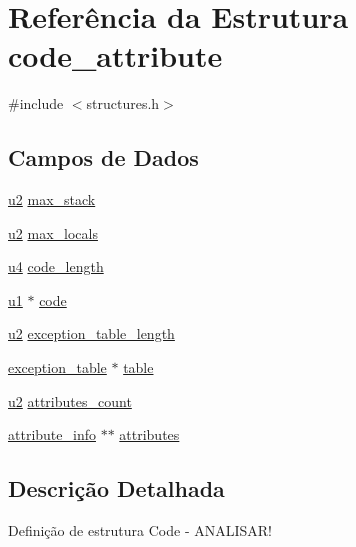 \hypertarget{structcode__attribute}{}\section{Referência da Estrutura code\+\_\+attribute}
\label{structcode__attribute}


{\ttfamily \#include $<$structures.\+h$>$}

\subsection*{Campos de Dados}
\begin{DoxyCompactItemize}
\item 
\hyperlink{lista__operandos_8h_a732cde1300aafb73b0ea6c2558a7a54f}{u2} \hyperlink{structcode__attribute_abd4d398c165a4e91f3ea559808931473}{max\+\_\+stack}
\item 
\hyperlink{lista__operandos_8h_a732cde1300aafb73b0ea6c2558a7a54f}{u2} \hyperlink{structcode__attribute_ab75487f3c1d38f9fb6ad5e71ab99dea2}{max\+\_\+locals}
\item 
\hyperlink{lista__operandos_8h_ae5be1f726785414dd1b77d60df074c9d}{u4} \hyperlink{structcode__attribute_a8c2176f2e2a92747fd2920fde5992b43}{code\+\_\+length}
\item 
\hyperlink{lista__operandos_8h_ad9f4cdb6757615aae2fad89dab3c5470}{u1} $\ast$ \hyperlink{structcode__attribute_a72ecf2f84184325965481ecbc8d997cd}{code}
\item 
\hyperlink{lista__operandos_8h_a732cde1300aafb73b0ea6c2558a7a54f}{u2} \hyperlink{structcode__attribute_ab84a776a1bdeb79fde3b47279d8e12e4}{exception\+\_\+table\+\_\+length}
\item 
\hyperlink{structexception__table}{exception\+\_\+table} $\ast$ \hyperlink{structcode__attribute_a8bdff0149755249696a5d6aa288d7a98}{table}
\item 
\hyperlink{lista__operandos_8h_a732cde1300aafb73b0ea6c2558a7a54f}{u2} \hyperlink{structcode__attribute_a7c0a342c05fa196324b0806f6704916b}{attributes\+\_\+count}
\item 
\hyperlink{structattribute__info}{attribute\+\_\+info} $\ast$$\ast$ \hyperlink{structcode__attribute_a6e986c701d34b14f33959e35606b46ed}{attributes}
\end{DoxyCompactItemize}


\subsection{Descrição Detalhada}
Definição de estrutura Code -\/ A\+N\+A\+L\+I\+S\+A\+R! 

